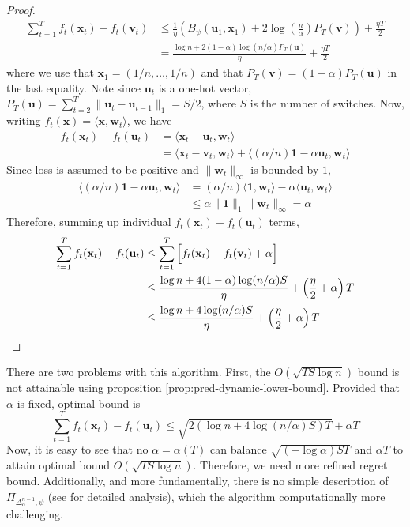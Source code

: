 \documentclass[12pt, a4paper]{report}
\begin{document}
\begin{proof}
\begin{align}
    \sum_{t=1}^T f_t(\mathbf{x}_t) - f_t(\mathbf{v}_t) &\leq  \frac{1}{\eta} \left(B_\psi(\mathbf{u}_1, \mathbf{x}_1) + 2\log\left(\frac{n}{\alpha}\right)P_T(\mathbf{v}) \right) + \frac{\eta T}{2} \nonumber
    \\
    &= \frac{\log n + 2(1-\alpha)\log(n / \alpha) P_T(\mathbf{u})}{\eta} + \frac{\eta T}{2} \nonumber
\end{align}
where we use that $\mathbf{x}_1 = (1/n, \dots, 1/n)$ and that $P_T(\mathbf{v}) = (1 - \alpha)P_T(\mathbf{u})$ in the last equality. Note since $\mathbf{u}_t$ is a one-hot vector, $P_T(\mathbf{u}) = \sum_{t=2}^T \lVert \mathbf{u}_t - \mathbf{u}_{t-1} \rVert_1 = S/2$, where $S$ is the number of switches. Now, writing $f_t(\mathbf{x}) = \langle \mathbf{x}, \mathbf{w}_t \rangle$, we have
\begin{align*}
    f_t(\mathbf{x}_t) - f_t(\mathbf{u}_t) &= \langle \mathbf{x}_t - \mathbf{u}_t, \mathbf{w}_t \rangle
    \\
    &= \langle \mathbf{x}_t - \mathbf{v}_t, \mathbf{w}_t \rangle + \langle (\alpha/n) \mathbf{1} - \alpha \mathbf{u}_t, \mathbf{w}_t \rangle
\end{align*}
Since loss is assumed to be positive and $\lVert \mathbf{w}_t \rVert_\infty$ is bounded by $1$,
\begin{align*}
    \langle (\alpha/n)\mathbf{1} - \alpha \mathbf{u}_t, \mathbf{w}_t \rangle &= (\alpha/n) \langle \mathbf{1}, \mathbf{w}_t \rangle - \alpha \langle \mathbf{u}_t, \mathbf{w}_t \rangle 
    \\
    &\leq \alpha \lVert \mathbf{1} \rVert_1 \lVert \mathbf{w}_t \rVert_\infty = \alpha
\end{align*}
Therefore, summing up individual $f_t(\mathbf{x}_t) - f_t(\mathbf{u}_t)$ terms,
\begin{align*}
    \sum_{t=1}^T f_t(\mathbf{x}_t) - f_t(\mathbf{u}_t) &\leq \sum_{t=1}^T \Big[ f_t(\mathbf{x}_t) - f_t(\mathbf{v}_t) + \alpha \Big]
    \\ 
    &\leq \frac{\log n + 4(1 - \alpha) \log(n/\alpha) S}{\eta} + \left(\frac{\eta}{2} + \alpha\right)T 
    \\
    &\leq \frac{\log n + 4\log(n/\alpha) S}{\eta} + \left(\frac{\eta}{2} + \alpha\right)T\qedhere
\end{align*}
\end{proof}
There are two problems with this algorithm. First, the $O(\sqrt{TS\log n})$ bound is not attainable using proposition \ref{prop:pred-dynamic-lower-bound}. Provided that $\alpha$ is fixed, optimal bound is 
\begin{equation*}
    \sum_{t=1}^T f_t(\mathbf{x}_t) - f_t(\mathbf{u}_t) \leq \sqrt{2(\log n + 4 \log(n/\alpha)S)T} + \alpha T
\end{equation*}
Now, it is easy to see that no $\alpha = \alpha(T)$ can balance $\sqrt{(-\log \alpha)ST}$ and $\alpha T$ to attain optimal bound $O(\sqrt{TS \log n})$. Therefore, we need more refined regret bound. Additionally, and more fundamentally, there is no simple description of $\Pi_{\Delta_\alpha^{n-1}, \psi}$ (see \cite[Theorem 7]{Herbster2001Tracking} for detailed analysis), which the algorithm computationally more challenging. 
\end{document}

